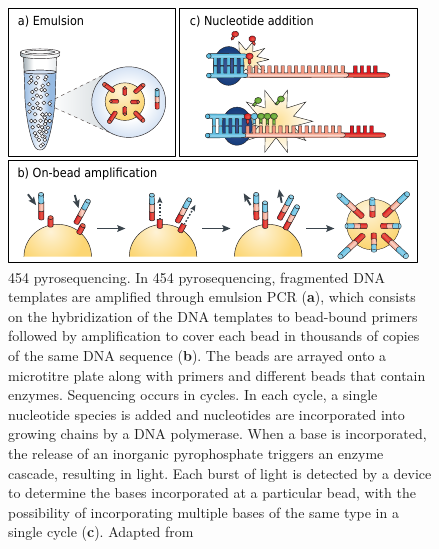 \begin{figure}[h!]
    \centering
    \includegraphics[angle=0,width=\textwidth]{figures/introduction/Figure4.pdf}
    \caption[454 pyrosequencing]{454 pyrosequencing. In 454 pyrosequencing, fragmented DNA templates are amplified through emulsion \ac{PCR} (\textbf{a}), which consists on the hybridization of the DNA templates to bead-bound primers followed by amplification to cover each bead in thousands of copies of the same DNA sequence (\textbf{b}). The beads are arrayed onto a microtitre plate along with primers and different beads that contain enzymes. Sequencing occurs in cycles. In each cycle, a single nucleotide species is added and nucleotides are incorporated into growing chains by a DNA polymerase. When a base is incorporated, the release of an inorganic pyrophosphate triggers an enzyme cascade, resulting in light. Each burst of light is detected by a device to determine the bases incorporated at a particular bead, with the possibility of incorporating multiple bases of the same type in a single cycle (\textbf{c}). Adapted from \cite{loman_twenty_2015, goodwin_coming_2016}}
    \label{fig:introduction_figure4}
\end{figure}

